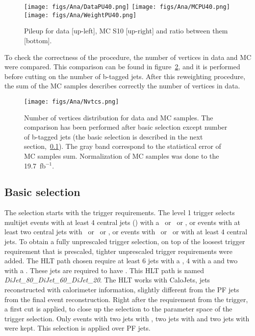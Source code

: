 \begin{figure}[!Hhtbp]
  \begin{center}
    \texttt{[image: figs/Ana/DataPU40.png]}
    \texttt{[image: figs/Ana/MCPU40.png]}
    \texttt{[image: figs/Ana/WeightPU40.png]}
    \caption{Pileup for data [up-left], MC S10 [up-right] and ratio between them [bottom].}
    \label{fig:PU_distros}
  \end{center}
\end{figure}

To check the correctness of the procedure, the number of vertices in data and MC were compared. This comparison can be found in figure~\ref{fig:NV_dataMC}, and it is performed before cutting on the number of b-tagged jets. After this reweighting procedure, the sum of the MC samples describes correctly the number of vertices in data.

\begin{figure}[!Hhtbp]
  \begin{center}
    \texttt{[image: figs/Ana/Nvtcs.png]}
    \caption{Number of vertices distribution for data and MC samples. The comparison has been performed after basic selection except number of b-tagged jets (the basic selection is described in the next section,~\ref{sec:basicsel}). The gray band correspond to the statistical error of MC samples sum. Normalization of MC samples was done to the 19.7~fb$^{-1}$.}
    \label{fig:NV_dataMC}
  \end{center}
\end{figure}

\subsection{Basic selection}
\label{sec:basicsel}

The selection starts with the trigger requirements. The level 1 trigger selects multijet events with at least 4 central jets () with a ~or ~or , or events with at least two central jets with ~or ~or , or events with ~or ~or  with at least 4 central jets. To obtain a fully unprescaled trigger selection, on top of the loosest trigger requirement that is prescaled, tighter unprescaled trigger requirements were added. The HLT path chosen require at least 6 jets with a , 4 with a  and two with a . These jets are required to have . This HLT path is named \textit{DiJet\_80\_DiJet\_60\_DiJet\_20}. The HLT works with CaloJets, jets reconstructed with calorimeter information, slightly different from the PF jets from the final event reconstruction. Right after the requirement from the trigger, a first cut is applied, to close up the selection to the parameter space of the trigger selection. Only events with two jets with , two jets with  and two jets with  were kept. This selection is applied over PF jets. %

